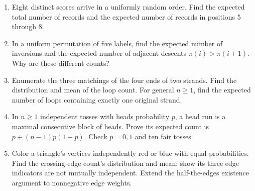 \begin{exercisebox}[title={Further practice: linearity in action}]
\begin{enumerate}[start=21]
 \item Eight distinct scores arrive in a uniformly random order.
 Find the expected total number of records and the expected number
 of records in positions 5 through 8. 
 \item In a uniform permutation of five labels, find the expected
 number of inversions and the expected number of adjacent descents
 $\pi(i)>\pi(i+1)$. Why are these different counts? 
 \item Enumerate the three matchings of the four ends of two strands.
 Find the distribution and mean of the loop count. For general $n\ge1$,
 find the expected number of loops containing exactly one original strand.
 \item In $n\ge1$ independent tosses with heads probability $p$, a
 head run is a maximal consecutive block of heads. Prove its expected
 count is $p+(n-1)p(1-p)$. Check $p=0,1$ and ten fair tosses.
 \item Color a triangle's vertices independently red or blue with
 equal probabilities. Find the crossing-edge count's distribution and
 mean; show its three edge indicators are not mutually independent.
 Extend the half-the-edges existence argument to nonnegative edge weights.
\end{enumerate}
\end{exercisebox}
